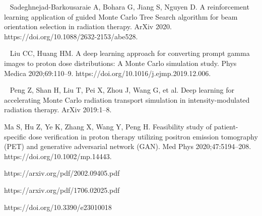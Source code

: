 \begin{thebibliography}{99}
~
Sadeghnejad-Barkousaraie A, Bohara G, Jiang S, Nguyen D. A reinforcement learning application of guided Monte Carlo Tree Search algorithm for beam orientation selection in radiation therapy. ArXiv 2020. https://doi.org/10.1088/2632-2153/abe528.

~ 
Liu CC, Huang HM. A deep learning approach for converting prompt gamma images to proton dose distributions: A Monte Carlo simulation study. Phys Medica 2020;69:110–9. https://doi.org/10.1016/j.ejmp.2019.12.006.

~
Peng Z, Shan H, Liu T, Pei X, Zhou J, Wang G, et al. Deep learning for accelerating Monte Carlo radiation transport simulation in intensity-modulated radiation therapy. ArXiv 2019:1–8.

 Ma S, Hu Z, Ye K, Zhang X, Wang Y, Peng H. Feasibility study of patient-specific dose verification in proton therapy utilizing positron emission tomography (PET) and generative adversarial network (GAN). Med Phys 2020;47:5194–208. https://doi.org/10.1002/mp.14443.


https://arxiv.org/pdf/2002.09405.pdf

https://arxiv.org/pdf/1706.02025.pdf

https://doi.org/10.3390/e23010018

\end{thebibliography}
